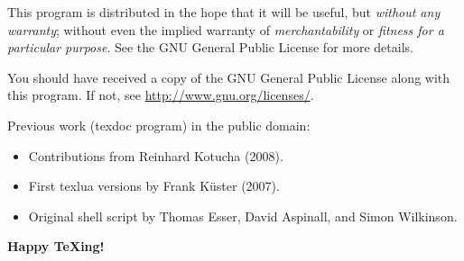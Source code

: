 \documentclass[a4paper, oneside]{scrartcl}
\newcommand\tex{\TeX\xspace}
\begin{document}
This program is distributed in the hope that it will be useful, but
\emph{without any warranty}; without even the implied warranty of
\emph{merchantability} or \emph{fitness for a particular purpose}.  See the
GNU General Public License for more details.

You should have received a copy of the GNU General Public License along with
this program.  If not, see \url{http://www.gnu.org/licenses/}.

\bigskip

Previous work (texdoc program) in the public domain:
\begin{itemize}
  \item Contributions from Reinhard Kotucha (2008).
  \item First texlua versions by Frank Küster (2007).
  \item Original shell script by Thomas Esser, David Aspinall, and Simon
	Wilkinson.
\end{itemize}

\bigskip
\begin{center}\Large\rmfamily\bfseries
  Happy \tex{}ing!
\end{center}
\end{document}
